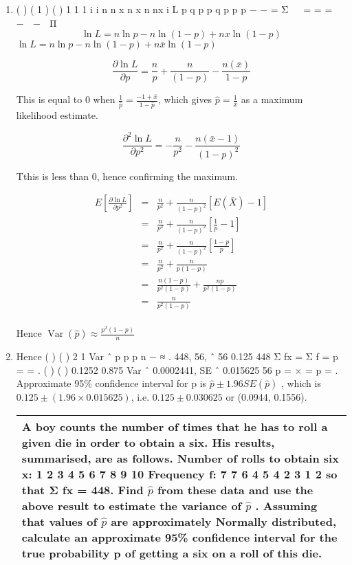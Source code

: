 \documentclass[a4paper,12pt]{article}
\begin{document}
\begin{enumerate}
\item ( ) ( 1 ) ( )
1
1
1
i i
n n
x n x n nx
i
L p q p p q p p
p
− −
=
Σ   = = =   −  −  Π
\[ \ln L = n \ln p − n\ln (1− p) + nx \ln(1− p)\]
$ \ln L = n\ln p - n \ln(1-p) + n\bar{x}\ln(1-p)$

\[\frac{\partial \ln L}{\partial p} = \frac{n}{p}  + \frac{n}{(1-p)} - \frac{n(\bar{x})}{1-p} \]

This is equal to 0 when
$ {\displaystyle \frac{1}{\hat{p}} = \frac{-1 + \bar{x}}{1 - \hat{p}} }$, which gives $ {\displaystyle\hat{p} = \frac{1}{x} }$ as a maximum likelihood estimate.

\[\frac{\partial^2 \ln L}{\partial p^2} = -\frac{n}{p^2} - \frac{n(\bar{x} - 1)}{(1-p)^2}\]

Tthis is less than 0, hence confirming the maximum.


\begin{eqnarray*}
E\left[ \frac{\partial \ln L}{\partial p^2} \right] 
&=& \frac{n}{p^2} + \frac{n}{(1-p)^2} \left[ E(\bar{X}) - 1 \right] \\
&=& \frac{n}{p^2} + \frac{n}{(1-p)^2} \left[ \frac{1}{p} - 1\right] \\
&=& \frac{n}{p^2} + \frac{n}{(1-p)^2} \left[ \frac{1-p}{p} \right] \\
&=& \frac{n}{p^2} + \frac{n}{p(1-p)} \\
&=& \frac{n(1-p)}{p^2(1-p)} + \frac{np}{p^2(1-p)} \\
&=& \frac{n}{p^2(1-p)}  \\
\end{eqnarray*}

Hence $\operatorname{Var}(\hat{p}) \approx \frac{p^2(1-p)}{n} $

\item Hence ( ) ( ) 2 1
Var ˆ
p p
p
n
−
≈ .
448, 56, ˆ 56 0.125
448
Σ fx = Σ f = p = = .
( ) ( )
0.1252 0.875 Var ˆ 0.0002441, SE ˆ 0.015625
56
p = × = p = .
Approximate 95\% confidence interval for p is $\hat{p} \pm 1.96SE(\hat{p})$ , which is
$0.125 \pm (1.96 \times 0.015625)$, i.e. $0.125 \pm 0.030625$ or (0.0944, 0.1556).

\begin{table}[ht!]
     \centering
     \begin{tabular}{|p{15cm}|}
     \hline        
\noindent A boy counts the number of times that he has to roll a given die in order to obtain
a six. His results, summarised, are as follows.
Number of rolls
to obtain six
x: 1 2 3 4 5 6 7 8 9 10
Frequency f: 7 7 6 4 5 4 2 3 1 2
so that Σ fx = 448. Find $\hat{p}$ from these data and use the above result to estimate
the variance of $\hat{p}$ . Assuming that values of $\hat{p}$ are approximately Normally
distributed, calculate an approximate 95\% confidence interval for the true
probability p of getting a six on a roll of this die.
\\ \hline
      \end{tabular}
    \end{table}
 

\end{enumerate}
\end{document}
